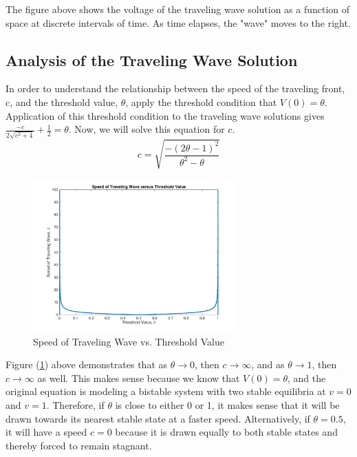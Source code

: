 \documentclass[12pt]{article}
\begin{document}
The figure above shows the voltage of the traveling wave solution as a function of space at discrete intervals of time. As time elapses, the "wave" moves to the right. 


\subsection{Analysis of the Traveling Wave Solution}
In order to understand the relationship between the speed of the traveling front, c, and the threshold value, $\theta$, apply the threshold condition that $V(0)=\theta$. Application of this threshold condition to the traveling wave solutions gives $\frac{-c}{2\sqrt{c^2+4}}+\frac{1}{2}=\theta$. Now, we will solve this equation for $c$. 
$$c=\sqrt{\frac{-(2\theta-1)^2}{\theta^2-\theta}}$$

\begin{figure}[H]
\centering
\includegraphics[width=0.7\textwidth]{cVStheta.jpg}
\caption{Speed of Traveling Wave vs. Threshold Value}
\label{test}
\end{figure}

Figure (\ref{test}) above demonstrates that as $\theta \rightarrow 0$, then $c \rightarrow \infty$, and as $\theta \rightarrow 1$, then $c \rightarrow \infty$ as well. This makes sense because we know that $V(0)=\theta$, and the original equation is modeling a bistable system with two stable equilibria at $v=0$ and $v=1$. Therefore, if $\theta$ is close to either 0 or 1, it makes sense that it will be drawn towards its nearest stable state at a faster speed. Alternatively, if $\theta=0.5$, it will have a speed $c=0$ because it is drawn equally to both stable states and thereby forced to remain stagnant. 
\end{document}
